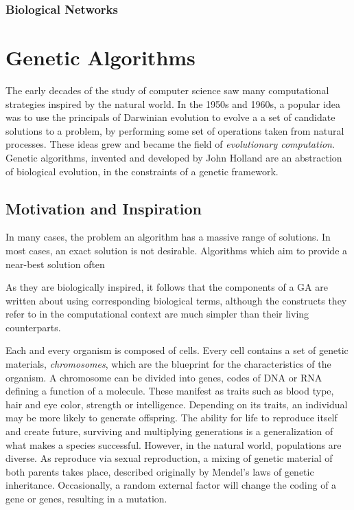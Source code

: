 \subsubsection{Biological Networks}



\section{Genetic Algorithms}
The early decades of the study of computer science saw many computational strategies inspired by the natural world. In the 1950s and 1960s, a popular idea was to use the principals of Darwinian evolution to evolve a a set of candidate solutions to a problem, by performing some set of operations taken from natural processes. These ideas grew and became the field of \textit{evolutionary computation}. Genetic algorithms, invented and developed by John Holland \cite{holland1975adaptation} are an abstraction of biological evolution, in the constraints of a genetic framework. 

\cite{Ding2007}

\subsection{Motivation and Inspiration}
In many cases, the problem an algorithm has a massive range of solutions. In most cases, an exact solution is not desirable. Algorithms which aim to provide a near-best solution often 

As they are biologically inspired, it follows that the components of a GA are written about using corresponding biological terms, although the constructs they refer to in the computational context are much simpler than their living counterparts.

Each and every organism is composed of cells. Every cell contains a set of genetic materials, \textit{chromosomes}, which are the blueprint for the characteristics of the organism. A chromosome can be divided into genes, codes of DNA or RNA defining a function of a molecule. These manifest as traits such as blood type, hair and eye color, strength or intelligence. Depending on its traits, an individual may be more likely to generate offspring. The ability for life to reproduce itself and create future, surviving and multiplying generations is a generalization of what makes a species successful. However, in the natural world, populations are diverse. As reproduce via sexual reproduction, a mixing of genetic material of both parents takes place, described originally by Mendel's laws of genetic inheritance. Occasionally, a random external factor will change the coding of a gene or genes, resulting in a mutation.

